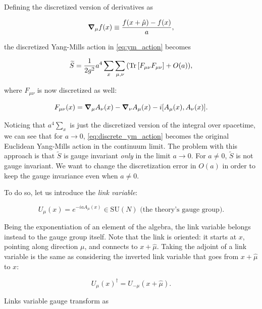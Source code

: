 \documentclass[reqno,12pt]{article}
\numberwithin{equation}{section}
\newcommand{\SU}{\mathrm{SU}}
\begin{document}
Defining the discretized version of derivatives as

\begin{equation} \label{eq:discrete_derivative}
	\grad_\mu f(x) \equiv \frac{f(x + \hat\mu) - f(x)}{a},
\end{equation}

the discretized Yang-Mills action in \eqref{eq:ym_action} becomes

\begin{equation} \label{eq:discrete_ym_action}
	\widetilde{S} = \frac{1}{2g^2} a^4 \sum_x \sum_{\mu,\nu} \qty(\Tr\qty[F_{\mu\nu}F_{\mu\nu}] + O(a)),
\end{equation}

where $F_{\mu\nu}$ is now discretized as well:

\begin{equation} \label{eq:discrete_Fmunu}
	F_{\mu\nu}(x) = \grad_\mu A_\nu(x) - \grad_\nu A_\mu(x) - i\qty[A_\mu(x), A_\nu(x)].
\end{equation}

Noticing that $a^4 \sum_x$ is just the discretized version of the integral over spacetime, we can see that for
$a \rightarrow 0$, \eqref{eq:discrete_ym_action} becomes the original Euclidean Yang-Mills action in the continuum limit.
The problem with this approach is that $\widetilde{S}$ is gauge invariant \textit{only} in the limit $a \rightarrow 0$. For
$a \ne 0$, $\widetilde{S}$ is not gauge invariant. We want to change the discretization error in $O(a)$ in order to keep the 
gauge invariance even when $a \ne 0$.

To do so, let us introduce the \textit{link variable}:

\begin{equation} \label{eq:link}
	U_\mu(x) = e^{-iaA_\mu(x)} \in \SU(N) \text{ (the theory's gauge group)}.
\end{equation}

Being the exponentiation of an element of the algebra, the link variable belongs instead to the gauge group itself.
Note that the link is oriented: it starts at $x$, pointing along direction $\mu$, and connects to $x + \hat{\mu}$. Taking
the adjoint of a link variable is the same as considering the inverted link variable that goes from $x + \hat{\mu}$ to $x$:

\begin{equation}
	U_\mu(x)^\dagger = U_{-\mu}(x + \hat{\mu}).
\end{equation}

Links variable gauge transform as
\end{document}
